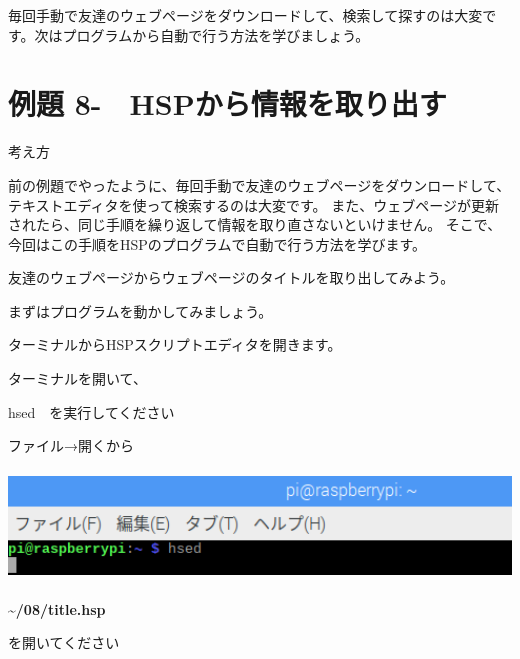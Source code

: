 \documentclass[a4paper,12pt,dvipdfmx]{jarticle}
\newcounter{Exercise}
\renewcommand\theExercise{例題 8-\arabic{Exercise}}
\begin{document}
\bigskip

毎回手動で友達のウェブページをダウンロードして、検索して探すのは大変です。次はプログラムから自動で行う方法を学びましょう。
\clearpage\section{\theExercise　HSPから情報を取り出す}
\addtocounter{Exercise}{-1}\label{E:SCRAPING}
考え方

前の例題でやったように、毎回手動で友達のウェブページをダウンロードして、テキストエディタを使って検索するのは大変です。
また、ウェブページが更新されたら、同じ手順を繰り返して情報を取り直さないといけません。
そこで、今回はこの手順をHSPのプログラムで自動で行う方法を学びます。

友達のウェブページからウェブページのタイトルを取り出してみよう。

まずはプログラムを動かしてみましょう。

ターミナルからHSPスクリプトエディタを開きます。

ターミナルを開いて、

hsed　を実行してください

ファイル→開くから

\begin{center}
\includegraphics[width=16.94cm,height=2.944cm]{textbook-img013.png}

\end{center}
\textbf{\~{}/08/title.hsp}

を開いてください
\end{document}
